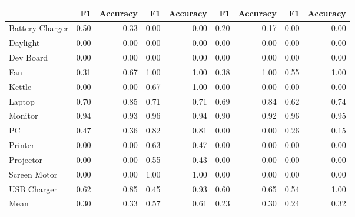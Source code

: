 \begin{tabular}{lrrrrrrrr}
\toprule
{} &    F1 &  Accuracy &    F1 &  Accuracy &    F1 &  Accuracy &    F1 &  Accuracy \\
\midrule
Battery Charger &  0.50 &      0.33 &  0.00 &      0.00 &  0.20 &      0.17 &  0.00 &      0.00 \\
Daylight        &  0.00 &      0.00 &  0.00 &      0.00 &  0.00 &      0.00 &  0.00 &      0.00 \\
Dev Board       &  0.00 &      0.00 &  0.00 &      0.00 &  0.00 &      0.00 &  0.00 &      0.00 \\
Fan             &  0.31 &      0.67 &  1.00 &      1.00 &  0.38 &      1.00 &  0.55 &      1.00 \\
Kettle          &  0.00 &      0.00 &  0.67 &      1.00 &  0.00 &      0.00 &  0.00 &      0.00 \\
Laptop          &  0.70 &      0.85 &  0.71 &      0.71 &  0.69 &      0.84 &  0.62 &      0.74 \\
Monitor         &  0.94 &      0.93 &  0.96 &      0.94 &  0.90 &      0.92 &  0.96 &      0.95 \\
PC              &  0.47 &      0.36 &  0.82 &      0.81 &  0.00 &      0.00 &  0.26 &      0.15 \\
Printer         &  0.00 &      0.00 &  0.63 &      0.47 &  0.00 &      0.00 &  0.00 &      0.00 \\
Projector       &  0.00 &      0.00 &  0.55 &      0.43 &  0.00 &      0.00 &  0.00 &      0.00 \\
Screen Motor    &  0.00 &      0.00 &  1.00 &      1.00 &  0.00 &      0.00 &  0.00 &      0.00 \\
USB Charger     &  0.62 &      0.85 &  0.45 &      0.93 &  0.60 &      0.65 &  0.54 &      1.00 \\
Mean            &  0.30 &      0.33 &  0.57 &      0.61 &  0.23 &      0.30 &  0.24 &      0.32 \\
\bottomrule
\end{tabular}

